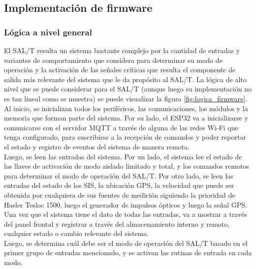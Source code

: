 \subsection{Implementación de firmware}

\subsubsection{Lógica a nivel general}


El SAL/T resulta un sistema bastante complejo por la cantidad de entradas y variantes de comportamiento que considera para determinar su modo de operación y la activación de las señales críticas que resulta el componente de salida más relevante del sistema que le da propósito al SAL/T. La lógica de alto nivel que se puede considerar para el SAL/T (aunque luego su implementación no es tan lineal como se muestra) se puede visualizar la figura \ref{fig:logica_firmware}.  \\


Al inicio, se inicializan todos los periféricos, las comunicaciones, los módulos y la memoria que forman parte del sistema. Por su lado, el ESP32 va a inicializarse y comunicarse con el servidor MQTT a través de alguna de las redes Wi-Fi que tenga configurado, para suscribirse a la recepción de comandos y poder reportar el estado y registro de eventos del sistema de manera remota. \\

Luego, se leen las entradas del sistema. Por un lado, el sistema lee el estado de las llaves de activación de modo aislado limitado y total, y los comandos remotos para determinar el modo de operación del SAL/T. Por otro lado, se leen las entradas del estado de los SIS, la ubicación GPS, la velocidad que puede ser obtenida por cualquiera de sus fuentes de medición siguiendo la prioridad de Hasler Tesloc 1500, luego el generador de impulsos ópticos y luego la señal GPS. \\ 

Una vez que el sistema tiene el dato de todas las entradas, va a mostrar a través del panel frontal y registrar a través del almacenamiento interno y remoto, cualquier estado o cambio relevante del sistema. \\ 

Luego, se determina cuál debe ser el modo de operación del SAL/T basado en el primer grupo de entradas mencionado, y se activan las rutinas de entrada en cada modo. \\

